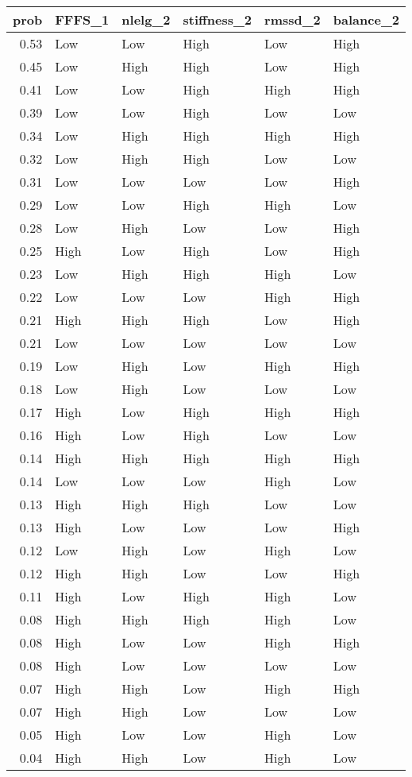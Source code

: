 \documentclass[
]{article}
\begin{document}
\begin{table}[H]

\caption{\label{tab:unnamed-chunk-6}}
\centering
\begin{tabular}[t]{r|l|l|l|l|l}
\hline
prob & FFFS\_1 & nlelg\_2 & stiffness\_2 & rmssd\_2 & balance\_2\\
\hline
0.53 & Low & Low & High & Low & High\\
\hline
0.45 & Low & High & High & Low & High\\
\hline
0.41 & Low & Low & High & High & High\\
\hline
0.39 & Low & Low & High & Low & Low\\
\hline
0.34 & Low & High & High & High & High\\
\hline
0.32 & Low & High & High & Low & Low\\
\hline
0.31 & Low & Low & Low & Low & High\\
\hline
0.29 & Low & Low & High & High & Low\\
\hline
0.28 & Low & High & Low & Low & High\\
\hline
0.25 & High & Low & High & Low & High\\
\hline
0.23 & Low & High & High & High & Low\\
\hline
0.22 & Low & Low & Low & High & High\\
\hline
0.21 & High & High & High & Low & High\\
\hline
0.21 & Low & Low & Low & Low & Low\\
\hline
0.19 & Low & High & Low & High & High\\
\hline
0.18 & Low & High & Low & Low & Low\\
\hline
0.17 & High & Low & High & High & High\\
\hline
0.16 & High & Low & High & Low & Low\\
\hline
0.14 & High & High & High & High & High\\
\hline
0.14 & Low & Low & Low & High & Low\\
\hline
0.13 & High & High & High & Low & Low\\
\hline
0.13 & High & Low & Low & Low & High\\
\hline
0.12 & Low & High & Low & High & Low\\
\hline
0.12 & High & High & Low & Low & High\\
\hline
0.11 & High & Low & High & High & Low\\
\hline
0.08 & High & High & High & High & Low\\
\hline
0.08 & High & Low & Low & High & High\\
\hline
0.08 & High & Low & Low & Low & Low\\
\hline
0.07 & High & High & Low & High & High\\
\hline
0.07 & High & High & Low & Low & Low\\
\hline
0.05 & High & Low & Low & High & Low\\
\hline
0.04 & High & High & Low & High & Low\\
\hline
\end{tabular}
\end{table}
\end{document}
